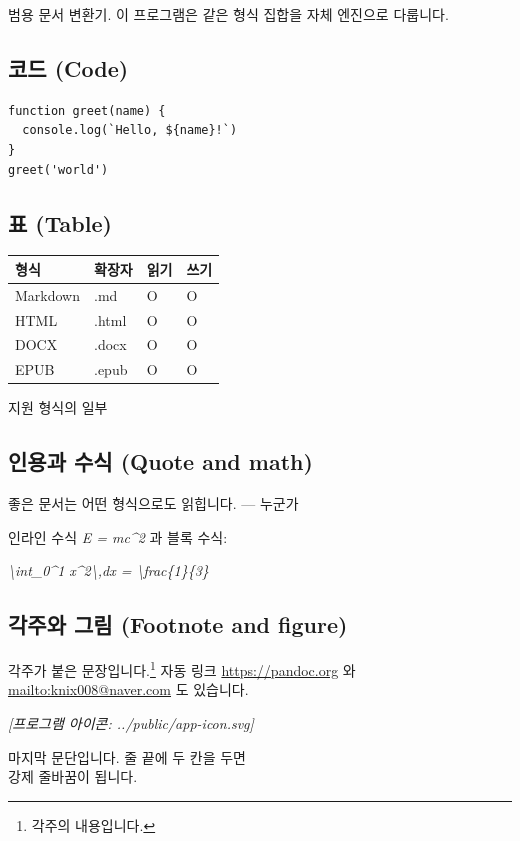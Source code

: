 \documentclass[11pt]{article}
\begin{document}
범용 문서 변환기. 이 프로그램은 같은 형식 집합을 자체 엔진으로 다룹니다.

\subsection*{코드 (Code)}\label{코드-code}

\begin{verbatim}
function greet(name) {
  console.log(`Hello, ${name}!`)
}
greet('world')
\end{verbatim}

\subsection*{표 (Table)}\label{표-table}

\begin{table}[htbp]
\centering
\begin{tabular}{llll}
\toprule
형식 & 확장자 & 읽기 & 쓰기 \\
\midrule
Markdown & .md & O & O \\
HTML & .html & O & O \\
DOCX & .docx & O & O \\
EPUB & .epub & O & O \\
\bottomrule
\end{tabular}
\end{table}

지원 형식의 일부

\subsection*{인용과 수식 (Quote and math)}\label{인용과-수식-quote-and-math}

좋은 문서는 어떤 형식으로도 읽힙니다. --- 누군가

인라인 수식 \emph{E = mc\^{}2} 과 블록 수식:

\emph{\textbackslash{}int\_0\^{}1 x\^{}2\textbackslash{},dx =
\textbackslash{}frac\{1\}\{3\}}

\subsection*{각주와 그림 (Footnote and figure)}\label{각주와-그림-footnote-and-figure}

각주가 붙은 문장입니다.\footnote{각주의 내용입니다.} 자동 링크 \url{https://pandoc.org} 와
\url{mailto:knix008@naver.com} 도 있습니다.

\emph{[프로그램 아이콘: ../public/app-icon.svg]}

마지막 문단입니다. 줄 끝에 두 칸을 두면\\
강제 줄바꿈이 됩니다.
\end{document}
